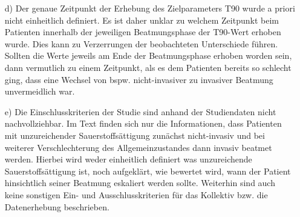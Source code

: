 \documentclass{scrartcl}
\theoremstyle{definition}
\theoremstyle{remark}
\begin{document}
\begin{enumerate}
	\item[d) ]Der genaue Zeitpunkt der Erhebung des Zielparameters T90 wurde a priori nicht einheitlich definiert. Es ist daher unklar zu welchem Zeitpunkt beim Patienten innerhalb der jeweiligen Beatmungsphase der T90-Wert erhoben wurde. Dies kann zu Verzerrungen der beobachteten Unterschiede führen. Sollten die Werte jeweils am Ende der Beatmungsphase erhoben worden sein, dann vermutlich zu einem Zeitpunkt, als es dem Patienten bereits so schlecht ging, dass eine Wechsel von bspw. nicht-invasiver zu invasiver Beatmung unvermeidlich war. 
	\item[e) ] Die Einschlusskriterien der Studie sind anhand der Studiendaten nicht nachvollziehbar. Im Text finden sich nur die Informationen, dass Patienten mit unzureichender Sauerstoffsättigung zunächst nicht-invasiv und bei weiterer Verschlechterung des Allgemeinzustandes dann invasiv beatmet werden. Hierbei wird weder einheitlich definiert was unzureichende Sauerstoffsättigung ist, noch aufgeklärt, wie bewertet wird, wann der Patient hinsichtlich seiner Beatmung eskaliert werden sollte. Weiterhin sind auch keine sonstigen Ein- und Ausschlusskriterien für das Kollektiv bzw. die Datenerhebung beschrieben.   
\end{enumerate}
\end{document}

